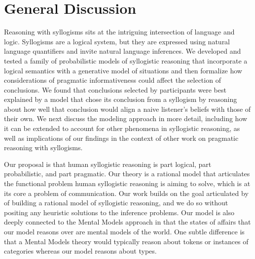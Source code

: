 \documentclass[floatsintext, doc]{apa6}
\begin{document}









\section{General Discussion}

Reasoning with syllogisms sits at the intriguing intersection of language and logic. 
Syllogisms are a logical system, but they are expressed using natural language quantifiers and invite natural language inferences. 
We developed and tested a family of probabilistic models of syllogistic reasoning that incorporate a logical semantics with a generative model of situations and then formalize how considerations of pragmatic informativeness could affect the selection of conclusions.
We found that conclusions selected by participants were best explained by a model that chose its conclusion from a syllogism by reasoning about how well that conclusion would align a naive listener's beliefs with those of their own. 
We next discuss the modeling approach in more detail, including how it can be extended to account for other phenomena in syllogistic reasoning, as well as implications of our findings in the context of other work on pragmatic reasoning with syllogisms.

Our proposal is that human syllogistic reasoning is part logical, part probabilistic, and part pragmatic. Our theory is a rational model that articulates the functional problem human syllogistic reasoning is aiming to solve, which is at its core a problem of communication. Our work builds on the goal articulated by  of building a rational model of syllogistic reasoning, and we do so without positing any heuristic solutions to the inference problems. Our model is also deeply connected to the Mental Models approach \cite{johnson1975models, johnson2015logic} in that the states of affairs that our model reasons over are mental models of the world. 
One subtle difference is that a Mental Models theory would typically reason about tokens or instances of categories whereas our model reasons about types. 
\end{document}
